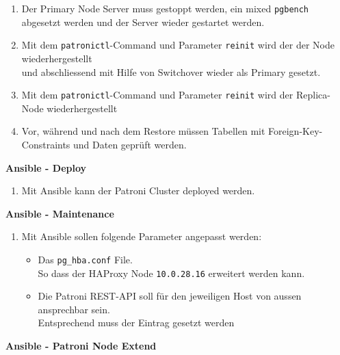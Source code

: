 \begin{flushleft}
\begin{description}
        \begin{enumerate}[resume]
            \item Der Primary Node Server muss gestoppt werden, ein mixed \texttt{pgbench} abgesetzt werden und der Server wieder gestartet werden.
            \item Mit dem \texttt{patronictl}-Command und Parameter \texttt{reinit} wird der der Node wiederhergestellt\\und abschliessend mit Hilfe von Switchover wieder als Primary gesetzt.
            \item Mit dem \texttt{patronictl}-Command und Parameter \texttt{reinit} wird der Replica-Node wiederhergestellt
            \item Vor, während und nach dem Restore müssen Tabellen mit Foreign-Key-Constraints und Daten geprüft werden.
        \end{enumerate}
        \item \textbf{Ansible - Deploy}\hfill \\
        \begin{enumerate}[resume]
            \item Mit \Gls{Ansible} kann der Patroni Cluster deployed werden.
        \end{enumerate}
        \item \textbf{Ansible - Maintenance}\hfill \\
        \begin{enumerate}[resume]
            \item Mit \Gls{Ansible} sollen folgende Parameter angepasst werden:
            \begin{itemize}
                \item Das \texttt{pg\_hba.conf} File.\\So dass der \Gls{HAProxy} Node \texttt{10.0.28.16} erweitert werden kann.
                \item Die Patroni REST-API soll für den jeweiligen Host von aussen ansprechbar sein.\\Entsprechend muss der Eintrag gesetzt werden
            \end{itemize}
        \end{enumerate}
        \item \textbf{Ansible - Patroni Node Extend}\hfill \\
        \begin{enumerate}[resume]

\end{enumerate}
\end{description}
\end{flushleft}
